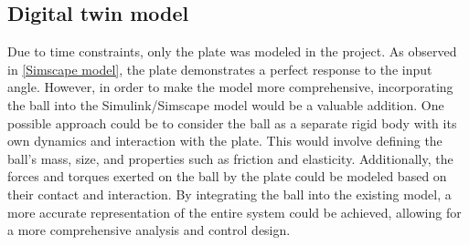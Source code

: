 \subsection{Digital twin model}
Due to time constraints, only the plate was modeled in the project. As observed in \ref{Simscape model}, the plate demonstrates a perfect response to the input angle. However, in order to make the model more comprehensive, incorporating the ball into the Simulink/Simscape model would be a valuable addition. One possible approach could be to consider the ball as a separate rigid body with its own dynamics and interaction with the plate. This would involve defining the ball's mass, size, and properties such as friction and elasticity. Additionally, the forces and torques exerted on the ball by the plate could be modeled based on their contact and interaction. By integrating the ball into the existing model, a more accurate representation of the entire system could be achieved, allowing for a more comprehensive analysis and control design.

